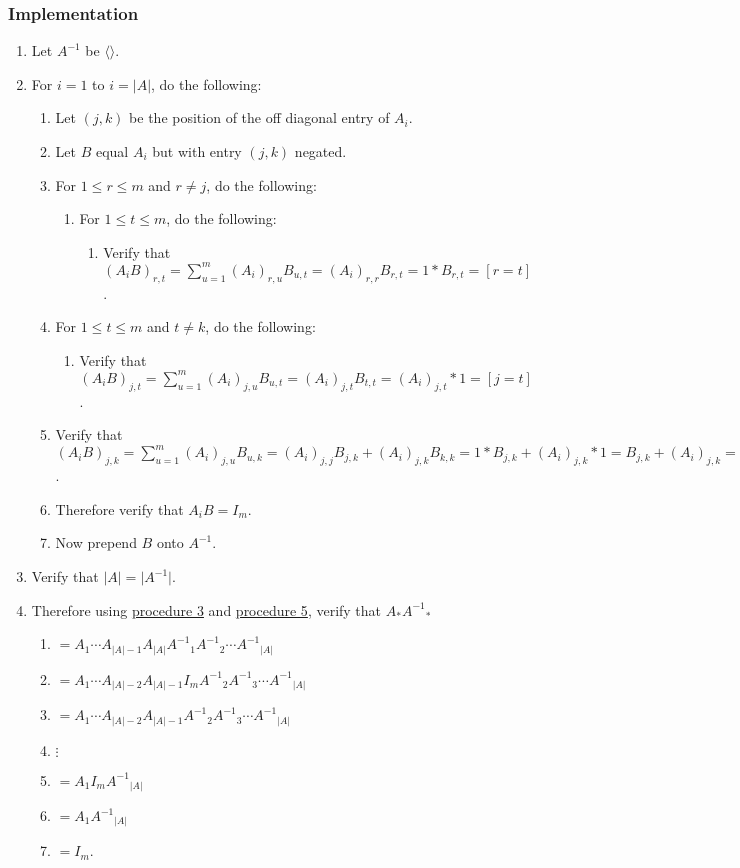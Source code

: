 \documentclass[twocolumn]{article}
\begin{document}
			\subsubsection{Implementation}
				\begin{enumerate}
					\item Let $A^{-1}$ be $\langle\rangle$.
					\item For $i=1$ to $i=\lvert A\rvert$, do the following:
					\begin{enumerate}
						\item Let $(j,k)$ be the position of the off diagonal entry of $A_i$.
						\item Let $B$ equal $A_i$ but with entry $(j,k)$ negated.
						\item For $1\le r\le m$ and $r\ne j$, do the following:
						\begin{enumerate}
							\item For $1\le t\le m$, do the following:
							\begin{enumerate}
								\item Verify that $(A_iB)_{r,t}=\sum_{u=1}^m (A_i)_{r,u}B_{u,t}=(A_i)_{r,r}B_{r,t}=1*B_{r,t}=[r=t]$.
							\end{enumerate}
						\end{enumerate}
						\item For $1\le t\le m$ and $t\ne k$, do the following:
						\begin{enumerate}
							\item Verify that $(A_iB)_{j,t}=\sum_{u=1}^m (A_i)_{j,u}B_{u,t}=(A_i)_{j,t}B_{t,t}=(A_i)_{j,t}*1=[j=t]$.
						\end{enumerate}
						\item Verify that $(A_iB)_{j,k}=\sum_{u=1}^m (A_i)_{j,u}B_{u,k}=(A_i)_{j,j}B_{j,k}+(A_i)_{j,k}B_{k,k}=1*B_{j,k}+(A_i)_{j,k}*1=B_{j,k}+(A_i)_{j,k}=0$.
						\item Therefore verify that $A_iB=I_m$.
						\item Now prepend $B$ onto $A^{-1}$.
					\end{enumerate}
					\item Verify that $\lvert A\rvert=\lvert A^{-1}\rvert$.
					\item Therefore using \hyperref[sec:procedure 3]{procedure 3} and \hyperref[sec:procedure 5]{procedure 5}, verify that $A_*{A^{-1}}_*$
					\begin{enumerate}
						\item $=A_1\cdots A_{\lvert A\rvert-1}A_{\lvert A\rvert}{A^{-1}}_1{A^{-1}}_2\cdots {A^{-1}}_{\lvert A\rvert}$
						\item $=A_1\cdots A_{\lvert A\rvert-2}A_{\lvert A\rvert-1}I_m{A^{-1}}_2{A^{-1}}_3\cdots {A^{-1}}_{\lvert A\rvert}$
						\item $=A_1\cdots A_{\lvert A\rvert-2}A_{\lvert A\rvert-1}{A^{-1}}_2{A^{-1}}_3\cdots {A^{-1}}_{\lvert A\rvert}$
						\item $\vdots$
						\item $=A_1I_m{A^{-1}}_{\lvert A\rvert}$
						\item $=A_1{A^{-1}}_{\lvert A\rvert}$
						\item $=I_m$.
					\end{enumerate}
				\end{enumerate}
\end{document}
